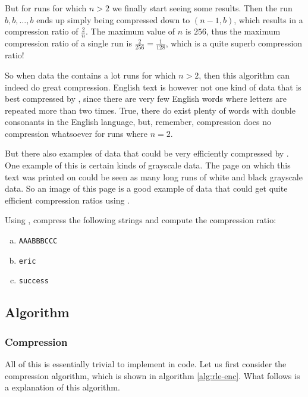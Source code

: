 But for runs for which $n > 2$ we finally start seeing some
results. Then the run $b, b, \dots, b$ ends up simply being compressed
down to $(n-1,b)$, which results in a compression ratio of
$\frac{2}{n}$. The maximum value of $n$ is $256$, thus the maximum
compression ratio of a single run is $\frac{2}{256} = \frac{1}{128}$,
which is a quite superb compression ratio!

So when data the contains a lot runs for which $n > 2$, then this
algorithm can indeed do great compression. English text is however not
one kind of data that is best compressed by \rle, since there are very
few English words where letters are repeated more than two
times. True, there do exist plenty of words with double consonants in
the English language, but, remember, \rle compression does no
compression whatsoever for runs where $n=2$.

But there also examples of data that could be very efficiently
compressed by \rle. One example of this is certain kinds of grayscale
data. The page on which this text was printed on could be seen as many
long runs of white and black grayscale data. So an image of this page
is a good example of data that could get quite efficient compression
ratios using \rle.

\begin{Exercise}[label={rle-compression}]
  Using \rle, compress the following strings and compute the
  compression ratio:

  \begin{enumerate}[(a)]
  \item \texttt{AAABBBCCC}
  \item \texttt{eric}
  \item \texttt{success}
  \end{enumerate}

\end{Exercise}

\subsection{Algorithm}

\subsubsection{Compression}

All of this is essentially trivial to implement in code. Let us first
consider the compression algorithm, which is shown in algorithm
\ref{alg:rle-enc}. What follows is a explanation of this algorithm.

